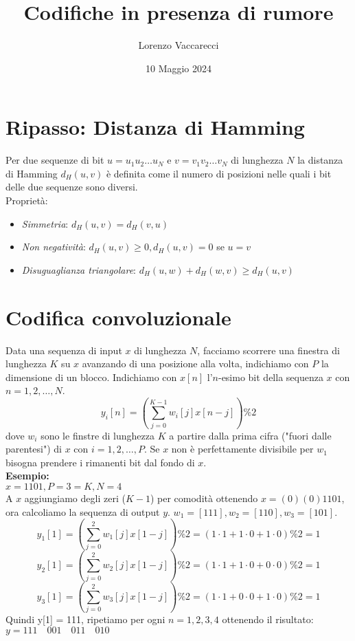 \documentclass[12pt]{article}
\title{Codifiche in presenza di rumore}
\author{Lorenzo Vaccarecci}
\date{10 Maggio 2024}
\begin{document}
\maketitle
\section{Ripasso: Distanza di Hamming}
Per due sequenze di bit $u=u_{1}u_{2}\ldots u_{N} \text{ e } v=v_{1}v_{2}\ldots v_{N}$ di lunghezza $N$ la distanza di Hamming $d_{H}(u,v)$ è definita come il  numero di posizioni nelle quali i bit delle due sequenze sono diversi.\\
Proprietà:
\begin{itemize}
    \item \textit{Simmetria}: $d_{H}(u,v)=d_{H}(v,u)$
    \item \textit{Non negatività}: $d_{H}(u,v)\geq 0, d_{H}(u,v)=0$ se $u=v$
    \item \textit{Disuguaglianza triangolare}: $d_{H}(u,w)+d_{H}(w,v)\geq d_{H}(u,v)$
\end{itemize}
\section{Codifica convoluzionale}
Data una sequenza di input $x$ di lunghezza $N$, facciamo scorrere una finestra di lunghezza $K$ su $x$ avanzando di una posizione alla volta, indichiamo con $P$ la dimensione di un blocco. Indichiamo con $x[n]$ l'$n$-esimo bit della sequenza $x$ con $n=1,2,\ldots, N$.
\begin{equation*}
    y_{i}[n] = \left(\sum_{j=0}^{K-1}w_{i}[j]x[n-j]\right)\% 2
\end{equation*}
dove $w_{i}$ sono le finstre di lunghezza $K$ a partire dalla prima cifra ("fuori dalle parentesi") di $x$ con $i=1, 2,\ldots, P$. Se $x$ non è perfettamente divisibile per $w_{1}$ bisogna prendere i rimanenti bit dal fondo di $x$.\\
\textbf{Esempio:}\\
$x=1101, P=3=K, N=4$\\
A $x$ aggiungiamo degli zeri ($K-1$) per comodità ottenendo $x=(0)(0)1101$, ora calcoliamo la sequenza di output $y$. $w_{1}=[111], w_{2}=[110], w_{3}=[101]$.
\begin{equation*}
    y_{1}[1] = \left(\sum_{j=0}^{2}w_{1}[j]x[1-j]\right)\% 2
    = (1\cdot 1 + 1 \cdot 0 + 1 \cdot 0) \% 2 = 1
\end{equation*}
\begin{equation*}
    y_{2}[1] = \left(\sum_{j=0}^{2}w_{2}[j]x[1-j]\right)\%2
    = (1 \cdot 1 + 1 \cdot 0 + 0 \cdot 0)\% 2 = 1
\end{equation*}
\begin{equation*}
    y_{3}[1] = \left(\sum_{j=0}^{2}w_{3}[j]x[1-j]\right)\% 2
    = (1 \cdot 1 + 0 \cdot 0 + 1 \cdot 0)\% 2 = 1
\end{equation*}
Quindi y[1] = 111, ripetiamo per ogni $n = 1,2,3,4$ ottenendo il risultato: $y=111\quad001\quad011\quad010$
\end{document}

